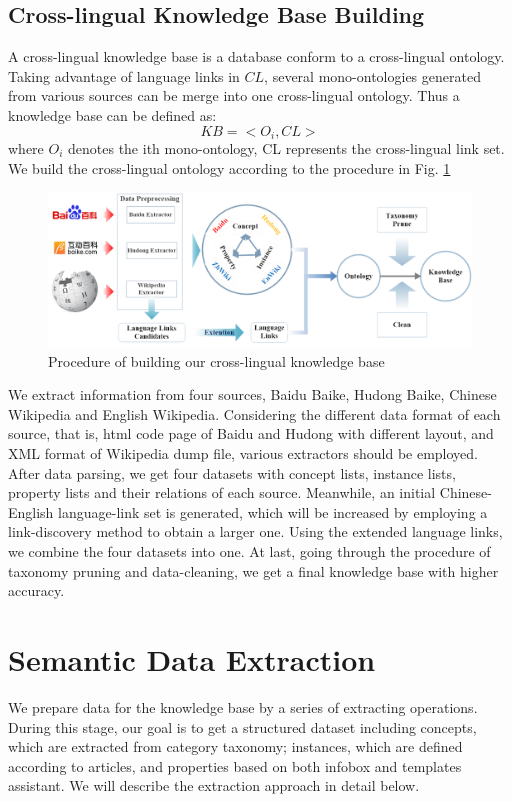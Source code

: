 \documentclass[runningheads,a4paper]{llncs}
\begin{document}
\subsection{Cross-lingual Knowledge Base Building}
A cross-lingual knowledge base is a database conform to a cross-lingual ontology. Taking advantage of language links in $CL$, several mono-ontologies generated from various sources can be merge into one cross-lingual ontology.  Thus a knowledge base can be defined as:
\begin{equation}
    KB = <O_{i}, CL>
\end{equation}
where $O_{i}$ denotes the ith mono-ontology, CL represents the cross-lingual link set.
We build the cross-lingual ontology according to the procedure in Fig. \ref{fig:procedure}
\begin{figure}[ht]
    \centerline{\includegraphics[width=1\columnwidth]{fig/procedure}}
    \caption{Procedure of building our cross-lingual knowledge base}
    \label{fig:procedure}
\end{figure}%
We extract information from four sources, Baidu Baike, Hudong Baike, Chinese Wikipedia and English Wikipedia. Considering the different data format of each source, that is, html code page of Baidu and Hudong with different layout, and XML format of Wikipedia dump file, various extractors should be employed. After data parsing, we get four datasets with concept lists, instance lists, property lists and their relations of each source. Meanwhile, an initial Chinese-English language-link set is generated, which will be increased by employing a link-discovery method to obtain a larger one. Using the extended language links, we combine the four datasets into one. At last, going through the procedure of taxonomy pruning and data-cleaning, we get a final knowledge base with higher accuracy.

\section{Semantic Data Extraction}
\label{sec:dp}
We prepare data for the knowledge base by a series of extracting operations. During this stage, our goal is to get a structured dataset including concepts, which are extracted from category taxonomy; instances, which are defined according to articles, and properties based on both infobox and templates assistant. We will describe the extraction approach in detail below.
\end{document}
